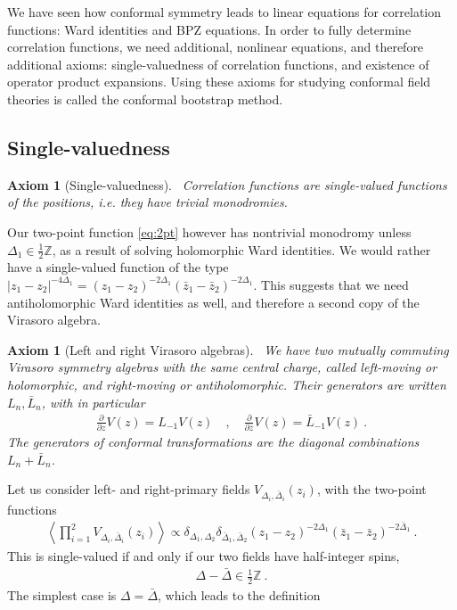 \documentclass[12pt, a4paper]{article}
\theoremstyle{break}
\newtheorem{hyp}[exo]{Axiom}
\begin{document}
We have seen how conformal symmetry leads to linear equations for correlation functions: Ward identities and BPZ equations. 
In order to fully determine correlation functions, we need additional, nonlinear equations, and therefore additional axioms: single-valuedness of correlation functions, and existence of operator product expansions. 
Using these axioms for studying conformal field theories is called the conformal bootstrap method. 

\subsection{Single-valuedness}\label{sec:sv}

\begin{hyp}[Single-valuedness]
 ~\label{hyp:sv}
 Correlation functions are single-valued functions of the positions, i.e. they have trivial monodromies.
\end{hyp}
Our two-point function \eqref{eq:2pt} however has nontrivial monodromy unless $\Delta_1\in \frac12\mathbb{Z}$, as a  result of solving holomorphic Ward identities. 
We would rather have a single-valued function of the type $|z_1-z_2|^{-4\Delta_1} = (z_1-z_2)^{-2\Delta_1} (\bar z_1-\bar z_2)^{-2\Delta_1}$.
This suggests that we need antiholomorphic Ward identities as well, and therefore a second copy of the Virasoro algebra.

\begin{hyp}[Left and right Virasoro algebras]
 ~\label{hyp:lr}
 We have two mutually commuting Virasoro symmetry algebras with the same central charge, called left-moving or holomorphic, and right-moving or antiholomorphic. Their generators are written $L_n,\bar L_n$, with in particular
 \begin{align}
  \frac{\partial}{\partial z} V(z) = L_{-1}V(z)   \quad , \quad \frac{\partial}{\partial \bar z} V(z)= \bar L_{-1} V(z)   \ .
 \end{align}
 The generators of conformal transformations are the diagonal combinations $L_n+\bar L_n$.
\end{hyp}
Let us consider left- and right-primary fields $V_{\Delta_i,\bar\Delta_i}(z_i)$, with the 
two-point functions
\begin{align}
 \left<\prod_{i=1}^2 V_{\Delta_i,\bar\Delta_i}(z_i) \right> \propto \delta_{\Delta_1,\Delta_2}\delta_{\bar\Delta_1,\bar\Delta_2} (z_1-z_2)^{-2\Delta_1} (\bar z_1-\bar z_2)^{-2\bar\Delta_1}\ .
\end{align}
This is single-valued if and only if our two fields have half-integer spins,
\begin{align}
 \Delta -\bar \Delta \in \frac12\mathbb{Z}\ .
\end{align} 
The simplest case is $\Delta=\bar\Delta$, which leads to the definition
\end{document}

